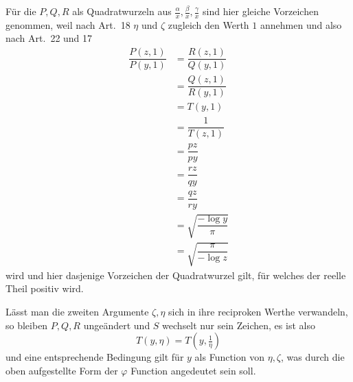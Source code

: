 Für die $P,\allowbreak Q,\allowbreak R$ als Quadratwurzeln aus $\frac{\alpha}{x},\allowbreak \frac{\beta}{x},\allowbreak \frac{\gamma}{x}$ sind hier gleiche Vorzeichen genommen, weil nach Art.~18 $\eta$ und $\zeta$ zugleich den Werth $1$ annehmen und also nach Art.~22 und 17
\[
\begin{aligned}\dfrac{P(z,1)}{P(y,1)}&=\dfrac{R(z,1)}{Q(y,1)}\\[7pt]&=\dfrac{Q(z,1)}{R(y,1)}\\[7pt]&=T(y,1)\\[7pt]&=\dfrac{1}{T(z,1)}\\[7pt]&=\dfrac{pz}{py}\\[7pt]&=\dfrac{rz}{qy}\\[7pt]&=\dfrac{qz}{ry}\\[7pt]&=\surd {\dfrac{-\log y}{\pi}}\\[7pt]&=\surd {\dfrac{\pi}{-\log z}}\end{aligned}
\]
wird und hier dasjenige Vorzeichen der Quadratwurzel gilt, für welches der reelle Theil positiv wird.

Lässt man die zweiten Argumente $\zeta,\allowbreak \eta$ sich in ihre reciproken Werthe verwandeln, so bleiben $P,\allowbreak Q,\allowbreak R$ ungeändert und $S$ wechselt nur sein Zeichen, es ist also
\[
T(y,\eta)=T(y,\tfrac{1}{\eta})
\]
und eine entsprechende Bedingung gilt für $y$ als Function von $\eta,\allowbreak \zeta$, was durch die oben aufgestellte Form der $\varphi$ Function angedeutet sein soll.

